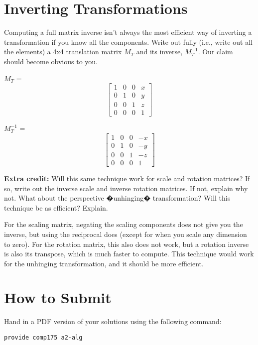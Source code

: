 \documentclass[10pt,twocolumn]{article}
\begin{document}
\section{Inverting Transformations}
\begin{framed}
\noindent {\bf [1 point]} Computing a full matrix inverse isn't always the most efficient way of inverting a transformation if you know all the components. Write out fully (i.e., write out all the elements) a 4x4 translation matrix $M_T$ and its inverse, $M^{-1}_T$. Our claim should become obvious to you.
\end{framed}

\begin{framed}
$M_T$ = 
 $$
	\begin{bmatrix}
	1 & 0 & 0 & x \\
	0 & 1 & 0 & y \\
	0 & 0 & 1 & z \\
	0 & 0 & 0 & 1
	\end{bmatrix}
 $$

$M_T^{-1}$ = 
 $$
	\begin{bmatrix}
	1 & 0 & 0 & -x \\
	0 & 1 & 0 & -y \\
	0 & 0 & 1 & -z \\
	0 & 0 & 0 & 1
	\end{bmatrix}
 $$

\end{framed}


{\bf Extra credit:} Will this same technique work for scale and rotation matrices? If so, write out the inverse scale and inverse rotation matrices. If not, explain why not. What about the perspective �unhinging� transformation? Will this technique be as efficient? Explain.

\begin{framed}
For the scaling matrix, negating the scaling components does not give you the inverse, but using the reciprocal does (except for when you scale any dimension to zero).
\vspace{1em}
For the rotation matrix, this also does not work, but a rotation inverse is also its transpose, which is much faster to compute.
\vspace{1em}
This technique would work for the unhinging transformation, and it should be more efficient.
\end{framed}


\section{How to Submit}

Hand in a PDF version of your solutions using the following command:
\begin{center}
 {\tt provide comp175 a2-alg}
 \end{center}
\end{document}
